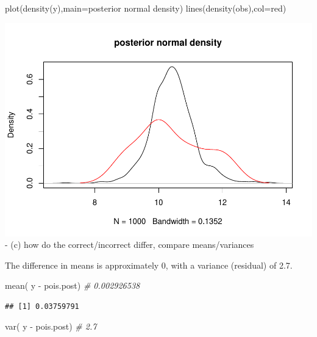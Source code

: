 \documentclass[
]{book}
\newenvironment{Shaded}{\begin{snugshade}}{\end{snugshade}}
\newcommand{\AttributeTok}[1]{\textcolor[rgb]{0.77,0.63,0.00}{#1}}
\newcommand{\CommentTok}[1]{\textcolor[rgb]{0.56,0.35,0.01}{\textit{#1}}}
\newcommand{\FunctionTok}[1]{\textcolor[rgb]{0.00,0.00,0.00}{#1}}
\newcommand{\NormalTok}[1]{#1}
\newcommand{\SpecialCharTok}[1]{\textcolor[rgb]{0.00,0.00,0.00}{#1}}
\newcommand{\StringTok}[1]{\textcolor[rgb]{0.31,0.60,0.02}{#1}}
\theoremstyle{definition}
\theoremstyle{definition}
\theoremstyle{definition}
\theoremstyle{definition}
\theoremstyle{remark}
\begin{document}
\begin{Shaded}
\begin{Highlighting}[]
  \FunctionTok{plot}\NormalTok{(}\FunctionTok{density}\NormalTok{(y),}\AttributeTok{main=}\StringTok{\textquotesingle{}posterior normal density\textquotesingle{}}\NormalTok{)}
  \FunctionTok{lines}\NormalTok{(}\FunctionTok{density}\NormalTok{(obs),}\AttributeTok{col=}\StringTok{\textquotesingle{}red\textquotesingle{}}\NormalTok{)}
\end{Highlighting}
\end{Shaded}

\includegraphics{_main_files/figure-latex/unnamed-chunk-37-2.pdf}
- (c) how do the correct/incorrect differ, compare means/variances

The difference in means is approximately 0, with a variance (residual) of 2.7.

\begin{Shaded}
\begin{Highlighting}[]
 \FunctionTok{mean}\NormalTok{( y }\SpecialCharTok{{-}}\NormalTok{ pois.post) }\CommentTok{\# 0.002926538}
\end{Highlighting}
\end{Shaded}

\begin{verbatim}
## [1] 0.03759791
\end{verbatim}

\begin{Shaded}
\begin{Highlighting}[]
 \FunctionTok{var}\NormalTok{( y }\SpecialCharTok{{-}}\NormalTok{ pois.post) }\CommentTok{\# 2.7}
\end{Highlighting}
\end{Shaded}
\end{document}
